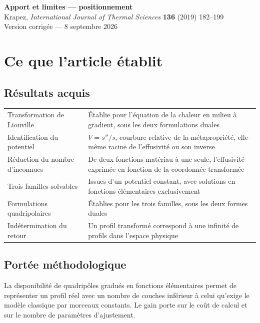 \documentclass[11pt,a4paper]{article}
\begin{document}
\begin{center}
{\Large\bfseries Apport et limites --- positionnement}\\[4pt]
{\small Krapez, \emph{International Journal of Thermal Sciences} \textbf{136} (2019) 182--199}\\[2pt]
{\small Version corrigée --- 8 septembre 2026}
\end{center}

\vspace{4pt}


\section{Ce que l'article établit}

\subsection{Résultats acquis}

\begin{center}
\begin{tabularx}{\textwidth}{@{}lX@{}}
\toprule
Transformation de Liouville & Établie pour l'équation de la chaleur en milieu à gradient, sous les deux
formulations duales \\
\addlinespace
Identification du potentiel & $V = s''/s$, courbure relative de la métapropriété, elle-même racine de
l'effusivité ou son inverse \\
\addlinespace
Réduction du nombre d'inconnues & De deux fonctions matériau à une seule, l'effusivité exprimée en
fonction de la coordonnée transformée \\
\addlinespace
Trois familles solvables & Issues d'un potentiel constant, avec solutions en fonctions élémentaires
exclusivement \\
\addlinespace
Formulations quadripolaires & Établies pour les trois familles, sous les deux formes duales \\
\addlinespace
Indétermination du retour & Un profil transformé correspond à une infinité de profils dans l'espace
physique \\
\bottomrule
\end{tabularx}
\end{center}

\subsection{Portée méthodologique}

La disponibilité de quadripôles gradués en fonctions élémentaires permet de représenter un profil réel
avec un nombre de couches inférieur à celui qu'exige le modèle classique par morceaux constants. Le
gain porte sur le coût de calcul et sur le nombre de paramètres d'ajustement.
\end{document}
